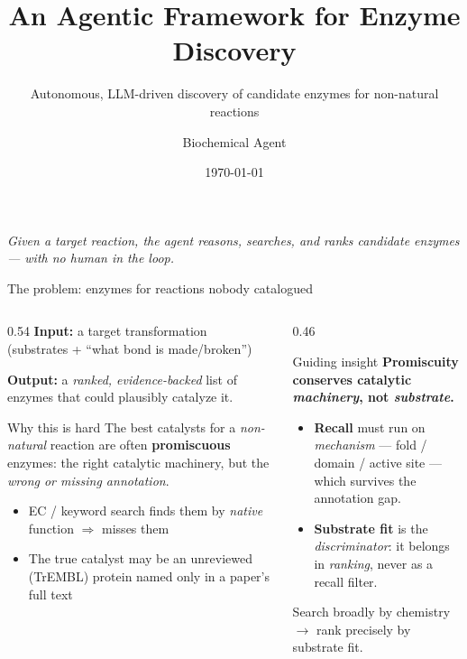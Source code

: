 \documentclass[aspectratio=169, 11pt]{beamer}
\title[Agentic Enzyme Discovery]{An Agentic Framework for Enzyme Discovery}
\subtitle{Autonomous, LLM-driven discovery of candidate enzymes for non-natural reactions}
\author{Biochemical Agent}
\institute{Argonne National Laboratory}
\date{\today}
\begin{document}
\begin{frame}[plain]
  \titlepage
  \begin{center}
    \footnotesize\color{darkgray}
    \emph{Given a target reaction, the agent reasons, searches, and ranks
    candidate enzymes --- with no human in the loop.}
  \end{center}
\end{frame}

\begin{frame}{The problem: enzymes for reactions nobody catalogued}
  \begin{columns}[T]
    \begin{column}{0.54\textwidth}
      \textbf{Input:} a target transformation \\[-2pt]
      {\footnotesize (substrates + ``what bond is made/broken'')}

      \medskip
      \textbf{Output:} a \emph{ranked, evidence-backed} list of enzymes that
      could plausibly catalyze it.

      \bigskip
      \begin{alertblock}{Why this is hard}
        \footnotesize
        The best catalysts for a \emph{non-natural} reaction are often
        \textbf{promiscuous} enzymes: the right catalytic machinery, but the
        \emph{wrong or missing annotation}.
        \begin{itemize}\setlength\itemsep{1pt}
          \item EC / keyword search finds them by \emph{native} function $\Rightarrow$ misses them
          \item The true catalyst may be an unreviewed (TrEMBL) protein named only in a paper's full text
        \end{itemize}
      \end{alertblock}
    \end{column}
    \begin{column}{0.46\textwidth}
      \begin{block}{Guiding insight}
        \footnotesize
        \textbf{Promiscuity conserves catalytic \emph{machinery}, not
        \emph{substrate}.}
        \begin{itemize}\setlength\itemsep{2pt}
          \item \textbf{Recall} must run on \emph{mechanism} ---
                fold / domain / active site --- which survives the annotation gap.
          \item \textbf{Substrate fit} is the \emph{discriminator}: it belongs in
                \emph{ranking}, never as a recall filter.
        \end{itemize}
      \end{block}
      \centering\scriptsize\color{darkgray}
      Search broadly by chemistry $\rightarrow$ rank precisely by substrate fit.
    \end{column}
  \end{columns}
\end{frame}
\end{document}
